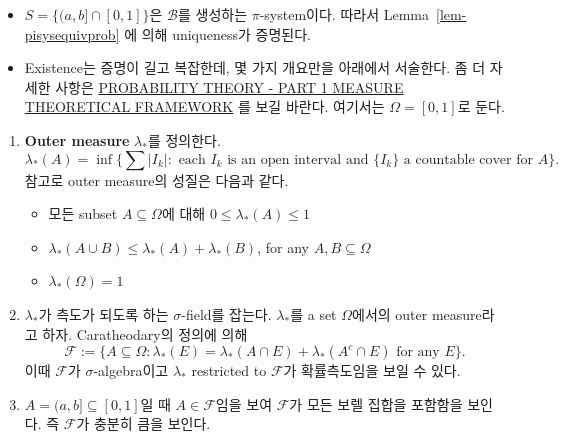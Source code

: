 \documentclass[
  13pt,
  letterpaper,
  DIV=11,
  numbers=noendperiod]{scrreprt}
\providecommand{\tightlist}{%
  \setlength{\itemsep}{0pt}\setlength{\parskip}{0pt}}\usepackage{longtable,booktabs,array}
\theoremstyle{plain}
\theoremstyle{definition}
\theoremstyle{definition}
\theoremstyle{plain}
\theoremstyle{definition}
\theoremstyle{plain}
\theoremstyle{remark}
\begin{document}
\begin{tcolorbox}[enhanced jigsaw, opacitybacktitle=0.6, bottomrule=.15mm, title=\textcolor{quarto-callout-note-color}{\faInfo}\hspace{0.5em}{Proof}, leftrule=.75mm, rightrule=.15mm, arc=.35mm, left=2mm, titlerule=0mm, colbacktitle=quarto-callout-note-color!10!white, bottomtitle=1mm, colframe=quarto-callout-note-color-frame, toptitle=1mm, coltitle=black, breakable, colback=white, toprule=.15mm, opacityback=0]

\begin{itemize}
\item
  \(S = \{ (a,b] \cap [0,1]\}\)은 \(\mathcal{B}\)를 생성하는
  \(\pi\)-system이다. 따라서 Lemma~\ref{lem-pisysequivprob} 에 의해
  uniqueness가 증명된다.
\item
  Existence는 증명이 길고 복잡한데, 몇 가지 개요만을 아래에서 서술한다.
  좀 더 자세한 사항은
  \href{https://math.iisc.ac.in/~manju/PT2019/Lectures-part1.pdf}{PROBABILITY
  THEORY - PART 1 MEASURE THEORETICAL FRAMEWORK} 를 보길 바란다.
  여기서는 \(\Omega = [0,1]\)로 둔다.
\end{itemize}

\end{tcolorbox}

\begin{enumerate}
\def\labelenumi{\arabic{enumi}.}
\item
  \textbf{Outer measure} \(\lambda_{*}\)를 정의한다. \[
  \lambda_{*}(A) = \inf \{ \sum \vert I_k \vert : \text{ each }I_k \text{ is an open interval and } \{I_k\} \text{ a countable cover for } A \}.
  \] 참고로 outer measure의 성질은 다음과 같다.

  \begin{itemize}
  \tightlist
  \item
    모든 subset \(A\subseteq \Omega\)에 대해
    \(0\leq \lambda_{*}(A) \leq 1\)
  \item
    \(\lambda_{*}(A\cup B) \leq \lambda_{*}(A) + \lambda_{*}(B)\), for
    any \(A, B \subseteq \Omega\)
  \item
    \(\lambda_{*}(\Omega)=1\)
  \end{itemize}
\item
  \(\lambda_{*}\)가 측도가 되도록 하는 \(\sigma\)-field를 잡는다.
  \(\lambda_{*}\)를 a set \(\Omega\)에서의 outer measure라고 하자.
  Caratheodary의 정의에 의해 \[
  \mathcal{F}:= \{ A\subseteq \Omega : \lambda_{*}(E) = \lambda_{*}(A\cap E) + \lambda_{*}(A^c \cap E) \text{ for any } E\}.
  \] 이때 \(\mathcal{F}\)가 \(\sigma\)-algebra이고 \(\lambda_{*}\)
  restricted to \(\mathcal{F}\)가 확률측도임을 보일 수 있다.
\item
  \(A= (a,b]\subseteq [0,1]\)일 때 \(A\in \mathcal{F}\)임을 보여
  \(\mathcal{F}\)가 모든 보렐 집합을 포함함을 보인다. 즉
  \(\mathcal{F}\)가 충분히 큼을 보인다.
\end{enumerate}
\end{document}
